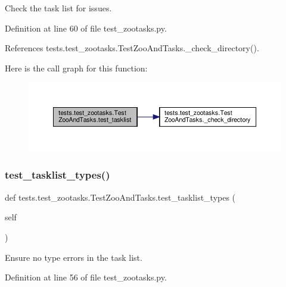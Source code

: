 \begin{DoxyVerb}Check the task list for issues.\end{DoxyVerb}
 

Definition at line 60 of file test\+\_\+zootasks.\+py.



References tests.\+test\+\_\+zootasks.\+Test\+Zoo\+And\+Tasks.\+\_\+check\+\_\+directory().

Here is the call graph for this function\+:
\nopagebreak
\begin{figure}[H]
\begin{center}
\leavevmode
\includegraphics[width=350pt]{classtests_1_1test__zootasks_1_1TestZooAndTasks_af33cbd4d8b989997428574cd787755ae_cgraph}
\end{center}
\end{figure}
\mbox{\label{classtests_1_1test__zootasks_1_1TestZooAndTasks_ae25086584b24c10c24a9bda486b32c4a}} 
\subsubsection{\texorpdfstring{test\+\_\+tasklist\+\_\+types()}{test\_tasklist\_types()}}
{\footnotesize\ttfamily def tests.\+test\+\_\+zootasks.\+Test\+Zoo\+And\+Tasks.\+test\+\_\+tasklist\+\_\+types (\begin{DoxyParamCaption}\item[{}]{self }\end{DoxyParamCaption})}

\begin{DoxyVerb}Ensure no type errors in the task list.\end{DoxyVerb}
 

Definition at line 56 of file test\+\_\+zootasks.\+py.



